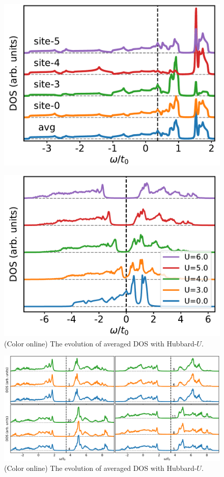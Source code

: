 \documentclass[aps,prb,amsfonts,amsmath,amssymb,showpacs,groupedaddress,superscriptaddress]{revtex4-1}
\begin{document}
\begin{figure}[p]
    \includegraphics[width=0.8\columnwidth]{fig/TBAForPhase2AndPhase3.pdf}
\end{figure}

\begin{figure}[p]
    \includegraphics[width=0.8\columnwidth]{fig/CPTForPhase2andPhase3.pdf}
    \caption{\label{fig:CPTForPhase2andPhase3} (Color online) The evolution of averaged DOS with Hubbard-$U$.}
\end{figure}

\begin{figure}[p]
    \includegraphics[width=0.8\columnwidth]{fig/CPTForPhase2andPhase3LDOS.pdf}
    \caption{\label{fig:CPTForPhase2andPhase3LDOS} (Color online) The evolution of averaged DOS with Hubbard-$U$.}
\end{figure}


\end{document}
